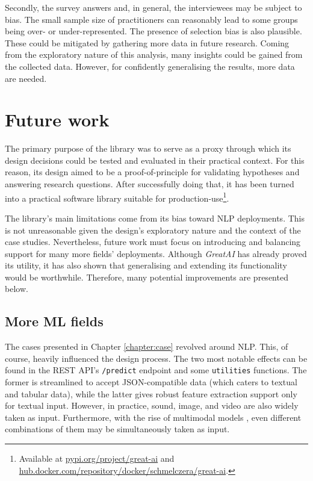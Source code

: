 Secondly, the survey answers and, in general, the interviewees may be subject to bias. The small sample size of practitioners can reasonably lead to some groups being over- or under-represented. The presence of selection bias is also plausible. These could be mitigated by gathering more data in future research. Coming from the exploratory nature of this analysis, many insights could be gained from the collected data. However, for confidently generalising the results, more data are needed.

\section{Future work} 

The primary purpose of the library was to serve as a proxy through which its design decisions could be tested and evaluated in their practical context. For this reason, its design aimed to be a proof-of-principle for validating hypotheses and answering research questions. After successfully doing that, it has been turned into a practical software library suitable for production-use\footnote{Available at \href{https://pypi.org/project/great-ai/}{pypi.org/project/great-ai} and \href{https://hub.docker.com/repository/docker/schmelczera/great-ai}{hub.docker.com/repository/docker/schmelczera/great-ai}.}. 
 
The library's main limitations come from its bias toward NLP deployments. This is not unreasonable given the design's exploratory nature and the context of the case studies. Nevertheless, future work must focus on introducing and balancing support for many more fields' deployments. Although \textit{GreatAI} has already proved its utility, it has also shown that generalising and extending its functionality would be worthwhile. Therefore, many potential improvements are presented below.

\subsection{More ML fields}

The cases presented in Chapter \ref{chapter:case} revolved around NLP. This, of course, heavily influenced the design process. The two most notable effects can be found in the REST API's \texttt{/predict} endpoint and some \texttt{utilities} functions. The former is streamlined to accept JSON-compatible data (which caters to textual and tabular data), while the latter gives robust feature extraction support only for textual input. However, in practice, sound, image, and video are also widely taken as input. Furthermore, with the rise of multimodal models \cite{gao2020survey}, even different combinations of them may be simultaneously taken as input.

